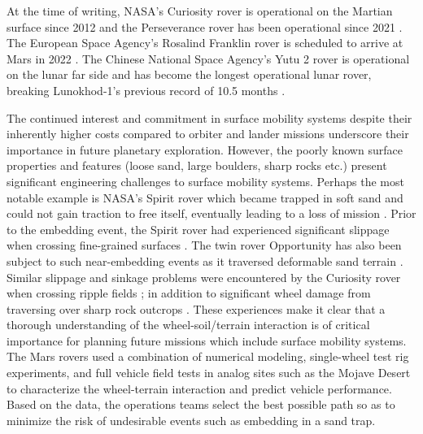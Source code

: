 \documentclass{article}
\begin{document}
At the time of writing, NASA's Curiosity rover is operational on the Martian surface since 2012 and the Perseverance rover has been operational since 2021 \cite{welch2013systems,williford2018nasa}. The European Space Agency's Rosalind Franklin rover is scheduled to arrive at Mars in 2022 \cite{vago2017habitability}. The Chinese National Space Agency's Yutu 2 rover is operational on the lunar far side and has become the longest operational lunar rover, breaking Lunokhod-1's previous record of 10.5 months \cite{ling2019close}.

The continued interest and commitment in surface mobility systems despite their inherently higher costs compared to orbiter and lander missions underscore their importance in future planetary exploration. However, the poorly known surface properties and features (loose sand, large boulders, sharp rocks etc.) present significant engineering challenges to surface mobility systems. Perhaps the most notable example is NASA's Spirit rover which became trapped in soft sand and could not gain traction to free itself, eventually leading to a loss of mission \cite{lorenz2014moving}. Prior to the embedding event, the Spirit rover had experienced significant slippage when crossing fine-grained surfaces \cite{li2008characterization}. The twin rover Opportunity has also been subject to such near-embedding events as it traversed deformable sand terrain \cite{zhou2014simulations,arvidson2011opportunity}. Similar slippage and sinkage problems were encountered by the Curiosity rover when crossing ripple fields \cite{arvidson2014roving}; in addition to significant wheel damage from traversing over sharp rock outcrops \cite{arvidson2017relating}. These experiences make it clear that a thorough understanding of the wheel-soil/terrain interaction is of critical importance for planning future missions which include surface mobility systems. The Mars rovers used a combination of numerical modeling, single-wheel test rig experiments, and full vehicle field tests in analog sites such as the Mojave Desert to characterize the wheel-terrain interaction and predict vehicle performance. Based on the data, the operations teams select the best possible path so as to minimize the risk of undesirable events such as embedding in a sand trap.
\end{document}

